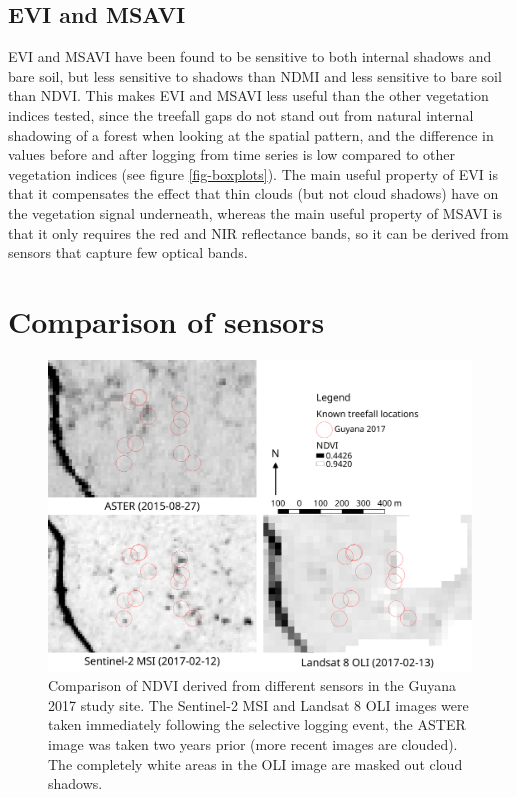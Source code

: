 \documentclass[a4paper,12pt]{scrbook}
\begin{document}
\subsection{EVI and MSAVI}

\ac{EVI} and \ac{MSAVI} have been found to be sensitive to both internal shadows and bare soil, but less sensitive to shadows than \ac{NDMI} and less sensitive to bare soil than \ac{NDVI}. This makes \ac{EVI} and \ac{MSAVI} less useful than the other vegetation indices tested, since the treefall gaps do not stand out from natural internal shadowing of a forest when looking at the spatial pattern, and the difference in values before and after logging from time series is low compared to other vegetation indices (see figure \ref{fig-boxplots}). The main useful property of \ac{EVI} is that it compensates the effect that thin clouds (but not cloud shadows) have on the vegetation signal underneath, whereas the main useful property of \ac{MSAVI} is that it only requires the red and \ac{NIR} reflectance bands, so it can be derived from sensors that capture few optical bands.

\section{Comparison of sensors}

\begin{figure}
  \centering
  \includegraphics[width=\textwidth]{thesis-figures/22-guyana17-sensor-resolution}
  \caption{Comparison of \ac{NDVI} derived from different sensors in the Guyana 2017 study site. The Sentinel-2 \ac{MSI} and Landsat 8 \ac{OLI} images were taken immediately following the selective logging event, the \ac{ASTER} image was taken two years prior (more recent images are clouded). The completely white areas in the \ac{OLI} image are masked out cloud shadows.}
  \label{fig-sensor-resolution}
\end{figure}
\end{document}
